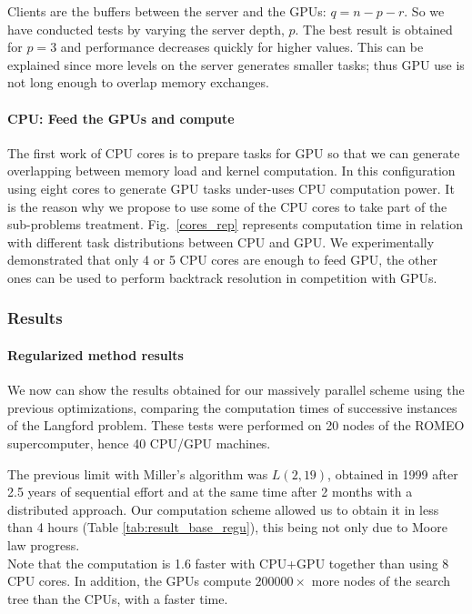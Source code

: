 Clients are the buffers between the server and the GPUs: 
$q = n - p- r$.
So we have conducted tests by varying the server depth, $p$. The best result is obtained for $p=3$ and performance decreases quickly for higher values. This can be explained since more levels on the server generates smaller tasks; thus GPU use is not long enough to overlap memory exchanges.

\paragraph{CPU: Feed the GPUs and compute}
The first work of CPU cores is to prepare tasks for GPU so that we can generate overlapping between memory load and kernel computation. In this configuration using eight cores to generate GPU tasks under-uses CPU computation power. It is the reason why we propose to use some of the CPU cores to take part of the sub-problems treatment. Fig.~\ref{cores_rep} represents computation time in relation with different task distributions between CPU and GPU.
We experimentally demonstrated that only 4 or 5 CPU cores are enough to feed GPU, the other ones can be used to perform backtrack resolution in competition with GPUs.

\subsubsection{Results}

\paragraph{Regularized method results}
We now can show the results obtained for our massively parallel scheme using the previous optimizations, comparing the computation times of successive instances of the Langford problem. These tests were performed on 20 nodes of the ROMEO supercomputer, hence 40 CPU/GPU machines.

The previous limit with Miller's algorithm was $L(2,19)$, obtained in 1999 after 2.5 years of sequential effort and at the same time after 2 months with a distributed approach\cite{Mil00}. Our computation scheme allowed us to obtain it in less than 4 hours (Table \ref{tab:result_base_regu}), this being not only due to Moore law progress.\\
Note that the computation is 1.6 faster with CPU+GPU together than using 8 CPU cores. In addition, the GPUs compute $200000\times$ more nodes of the search tree than the CPUs, with a faster time.

